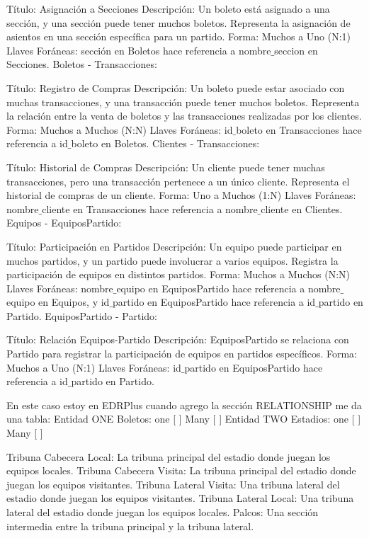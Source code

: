 Título: Asignación a Secciones
Descripción: Un boleto está asignado a una sección, y una sección puede tener muchos boletos. Representa la asignación de asientos en una sección específica para un partido.
Forma: Muchos a Uno (N:1)
Llaves Foráneas: sección en Boletos hace referencia a nombre$\_$seccion en Secciones.
Boletos - Transacciones:

Título: Registro de Compras
Descripción: Un boleto puede estar asociado con muchas transacciones, y una transacción puede tener muchos boletos. Representa la relación entre la venta de boletos y las transacciones realizadas por los clientes.
Forma: Muchos a Muchos (N:N)
Llaves Foráneas: id$\_$boleto en Transacciones hace referencia a id$\_$boleto en Boletos.
Clientes - Transacciones:

Título: Historial de Compras
Descripción: Un cliente puede tener muchas transacciones, pero una transacción pertenece a un único cliente. Representa el historial de compras de un cliente.
Forma: Uno a Muchos (1:N)
Llaves Foráneas: nombre$\_$cliente en Transacciones hace referencia a nombre$\_$cliente en Clientes.
Equipos - EquiposPartido:

Título: Participación en Partidos
Descripción: Un equipo puede participar en muchos partidos, y un partido puede involucrar a varios equipos. Registra la participación de equipos en distintos partidos.
Forma: Muchos a Muchos (N:N)
Llaves Foráneas: nombre$\_$equipo en EquiposPartido hace referencia a nombre$\_$equipo en Equipos, y id$\_$partido en EquiposPartido hace referencia a id$\_$partido en Partido.
EquiposPartido - Partido:

Título: Relación Equipos-Partido
Descripción: EquiposPartido se relaciona con Partido para registrar la participación de equipos en partidos específicos.
Forma: Muchos a Uno (N:1)
Llaves Foráneas: id$\_$partido en EquiposPartido hace referencia a id$\_$partido en Partido.








En este caso estoy en EDRPlus 
cuando agrego la sección RELATIONSHIP me da una tabla:
Entidad ONE
 Boletos: 
               one [ ]
               Many [ ]
Entidad TWO
 Estadios: 
               one [ ]
               Many [ ]

Tribuna Cabecera Local: La tribuna principal del estadio donde juegan los equipos locales.
Tribuna Cabecera Visita: La tribuna principal del estadio donde juegan los equipos visitantes.
Tribuna Lateral Visita: Una tribuna lateral del estadio donde juegan los equipos visitantes.
Tribuna Lateral Local: Una tribuna lateral del estadio donde juegan los equipos locales.
Palcos: Una sección intermedia entre la tribuna principal y la tribuna lateral.